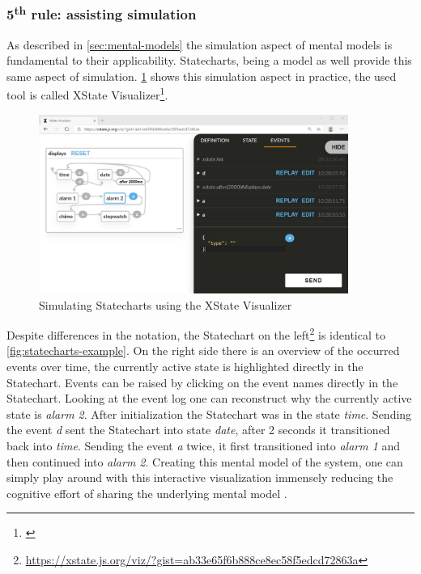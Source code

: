 \subsubsection{5\textsuperscript{th} rule: assisting simulation}
As described in \cref{sec:mental-models} the simulation aspect of mental models is fundamental to their applicability.
Statecharts, being a model as well provide this same aspect of simulation.
\cref{fig:xstate-simulation} shows this simulation aspect in practice, the used tool is called XState Visualizer\footnote{\url{}}.
\begin{figure}[h]
\centering
\includegraphics[width=0.9\textwidth]{images/xstate-simulation}
\caption{Simulating Statecharts using the XState Visualizer}
\label{fig:xstate-simulation}
\end{figure}
Despite differences in the notation, the Statechart on the left\footnote{\url{https://xstate.js.org/viz/?gist=ab33e65f6b888ce8ec58f5edcd72863a}} is identical to \cref{fig:statecharts-example}.
On the right side there is an overview of the occurred events over time, the currently active state is highlighted directly in the Statechart.
Events can be raised by clicking on the event names directly in the Statechart.
Looking at the event log one can reconstruct why the currently active state is \emph{alarm 2}.
After initialization the Statechart was in the state \emph{time}. Sending the event \emph{d} sent the Statechart into state \emph{date}, after 2 seconds it transitioned back into \emph{time}.
Sending the event \emph{a} twice, it first transitioned into \emph{alarm 1} and then continued into \emph{alarm 2}.
Creating this mental model of the system, one can simply play around with this interactive visualization immensely reducing the cognitive effort of sharing the underlying mental model \autocite{dutke_mentale_1994}.

